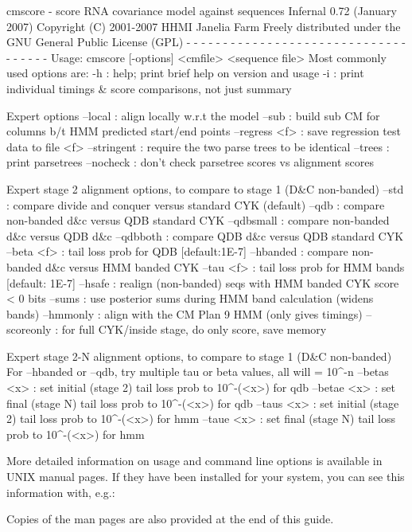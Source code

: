 \begin{sreoutput}
cmscore - score RNA covariance model against sequences
Infernal 0.72 (January 2007)
Copyright (C) 2001-2007 HHMI Janelia Farm
Freely distributed under the GNU General Public License (GPL)
- - - - - - - - - - - - - - - - - - - - - - - - - - - - - - - - - - - -
Usage: cmscore [-options] <cmfile> <sequence file>
  Most commonly used options are:
   -h     : help; print brief help on version and usage
   -i     : print individual timings & score comparisons, not just summary

  Expert options
   --local       : align locally w.r.t the model
   --sub         : build sub CM for columns b/t HMM predicted start/end points
   --regress <f> : save regression test data to file <f>
   --stringent   : require the two parse trees to be identical
   --trees       : print parsetrees
   --nocheck     : don't check parsetree scores vs alignment scores

  Expert stage 2 alignment options, to compare to stage 1 (D&C non-banded)
   --std         : compare divide and conquer versus standard CYK (default)
   --qdb         : compare non-banded d&c versus QDB standard CYK
   --qdbsmall    : compare non-banded d&c versus QDB d&c
   --qdbboth     : compare        QDB d&c versus QDB standard CYK
   --beta <f>    : tail loss prob for QDB [default:1E-7]
   --hbanded     : compare non-banded d&c versus HMM banded CYK
   --tau <f>     : tail loss prob for HMM bands [default: 1E-7]
   --hsafe       : realign (non-banded) seqs with HMM banded CYK score < 0 bits
   --sums        : use posterior sums during HMM band calculation (widens bands)
   --hmmonly     : align with the CM Plan 9 HMM (only gives timings)
   --scoreonly   : for full CYK/inside stage, do only score, save memory

  Expert stage 2-N alignment options, to compare to stage 1 (D&C non-banded)
  For --hbanded or --qdb, try multiple tau or beta values, all will = 10^-n
   --betas <x>   : set initial (stage 2) tail loss prob to 10^-(<x>) for qdb
   --betae <x>   : set final   (stage N) tail loss prob to 10^-(<x>) for qdb
   --taus <x>    : set initial (stage 2) tail loss prob to 10^-(<x>) for hmm
   --taue <x>    : set final   (stage N) tail loss prob to 10^-(<x>) for hmm
\end{sreoutput}

More detailed information on usage and command line options is
available in UNIX manual pages. If they have been installed for your
system, you can see this information with, e.g.:


Copies of the man pages are also provided at the end of this guide.





